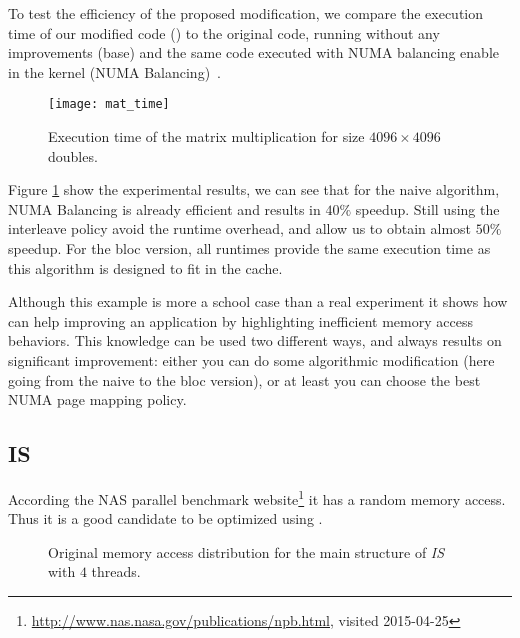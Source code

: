 To test the efficiency of the proposed modification, we compare the execution
time of our modified code (\TABARNAC) to the original code, running without any
improvements (base) and the same code executed with NUMA balancing enable in the
kernel (NUMA Balancing)~\cite{Corbet}.

\begin{figure}[htb]
    \centering
    \texttt{[image: mat\_time]}
    \caption{Execution time of the matrix multiplication for size $4096\times 4096$ doubles.}
    \label{fig:matrix-res}
\end{figure}

Figure \ref{fig:matrix-res} show the experimental results, we can see that for
the naive algorithm, NUMA Balancing is already efficient and results in $40\%$
speedup. Still using the interleave policy avoid the runtime overhead, and
allow us to obtain almost $50\%$ speedup. For the bloc version, all runtimes
provide the same execution time as this algorithm is designed to fit in the
cache.

Although this example is more a school case than a real experiment it shows
how \TABARNAC can help improving an application by highlighting inefficient
memory access behaviors. This knowledge can be used two different ways, and always
results on significant improvement: either you can do some algorithmic
modification (here going from the naive to the bloc version), or at least you
can choose the best NUMA page mapping policy.

\subsection{IS}
\label{sec:exp-is}

According the NAS parallel benchmark
website\footnote{\url{http://www.nas.nasa.gov/publications/npb.html}, visited
2015-04-25} it has a random memory access. Thus it is a good candidate to be
optimized using \TABARNAC.

\begin{figure}[htb]
    \centering

    \caption{Original memory access distribution for the main structure of
        \emph{IS} with $4$ threads.}
    \label{fig:is-behaviour-orig}
\end{figure}

